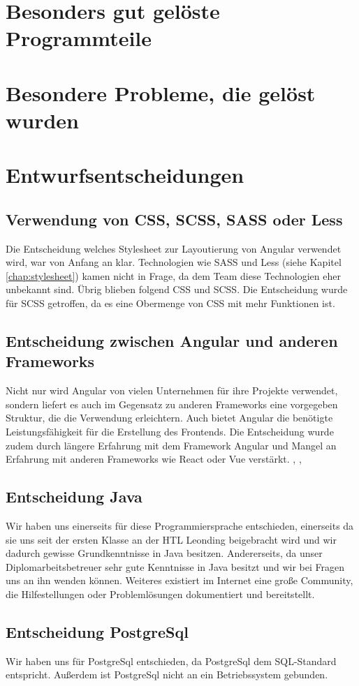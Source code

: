 \section{Besonders gut gelöste Programmteile}


\section{Besondere Probleme, die gelöst wurden}


\section{Entwurfsentscheidungen}
\subsection{Verwendung von CSS, SCSS, SASS oder Less}
Die Entscheidung welches Stylesheet zur Layoutierung von Angular verwendet wird, war von Anfang an klar.
Technologien wie SASS und Less (siehe Kapitel \ref{chap:stylesheet}) kamen nicht in Frage, da dem Team diese Technologien eher unbekannt sind.
Übrig blieben folgend CSS und SCSS. Die Entscheidung wurde für SCSS getroffen, da es 
eine Obermenge von CSS mit mehr Funktionen ist.

\subsection{Entscheidung zwischen Angular und anderen Frameworks}
Nicht nur wird Angular von vielen Unternehmen für ihre Projekte verwendet, sondern liefert es auch im Gegensatz zu anderen Frameworks 
eine vorgegeben Struktur, die die Verwendung erleichtern. Auch bietet Angular die benötigte Leistungsfähigkeit für die Erstellung des Frontends. 
Die Entscheidung wurde zudem durch längere Erfahrung mit dem Framework Angular und Mangel an Erfahrung mit anderen Frameworks 
wie React oder Vue verstärkt. \cite{noauthor_angular_nodate-5}, \cite{noauthor_angular_nodate-6}, \cite{noauthor_vue_nodate}

\subsection{Entscheidung Java}
Wir haben uns einerseits für diese Programmiersprache entschieden, 
einerseits da sie uns seit der ersten Klasse an der HTL Leonding beigebracht wird und wir dadurch gewisse 
Grundkenntnisse in Java besitzen. Andererseits, da unser Diplomarbeitsbetreuer sehr gute Kenntnisse in Java 
besitzt und wir bei Fragen uns an ihn wenden können. Weiteres existiert im Internet eine große Community, 
die Hilfestellungen oder Problemlösungen dokumentiert und bereitstellt.

\subsection{Entscheidung PostgreSql}
Wir haben uns für PostgreSql entschieden, da PostgreSql dem SQL-Standard entspricht. 
Außerdem ist PostgreSql nicht an ein Betriebssystem gebunden.
